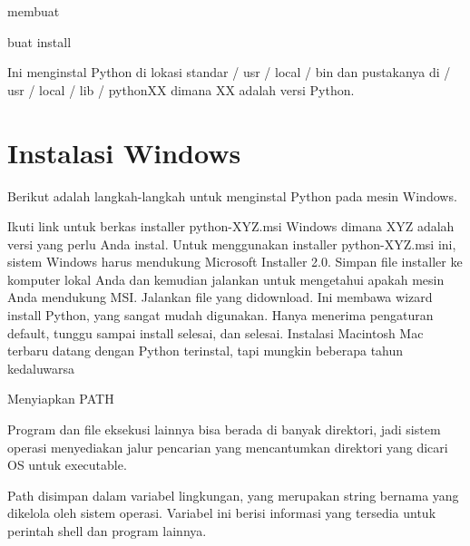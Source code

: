 {{\noindent
{\fontsize{14pt}{14pt}\selectfont membuat \\} \par
\vspace{14pt}
\noindent
{\fontsize{14pt}{14pt}\selectfont buat install \\} \par
\vspace{14pt}
\noindent
{\fontsize{14pt}{14pt}\selectfont Ini menginstal Python di lokasi standar / usr / local / bin dan pustakanya di / usr / local / lib / pythonXX dimana XX adalah versi Python. \\} \par
\vspace{14pt}
\noindent
{\fontsize{14pt}{14pt}\section {Instalasi Windows }
\noindent
{\fontsize{14pt}{14pt}\selectfont Berikut adalah langkah-langkah untuk menginstal Python pada mesin Windows. \\} \par
\noindent
{\fontsize{14pt}{14pt}\selectfont \vspace{\baselineskip}
Ikuti link untuk berkas installer python-XYZ.msi Windows dimana XYZ adalah versi yang perlu Anda instal. Untuk menggunakan installer python-XYZ.msi ini, sistem Windows harus mendukung Microsoft Installer 2.0. Simpan file installer ke komputer lokal Anda dan kemudian jalankan untuk mengetahui apakah mesin Anda mendukung MSI. Jalankan file yang didownload. Ini membawa wizard install Python, yang sangat mudah digunakan. Hanya menerima pengaturan default, tunggu sampai install selesai, dan selesai. Instalasi Macintosh Mac terbaru datang dengan Python terinstal, tapi mungkin beberapa tahun kedaluwarsa \\} \par
\noindent
{\fontsize{14pt}{14pt}\selectfont Menyiapkan PATH \\} \par
\noindent
{\fontsize{14pt}{14pt}\selectfont Program dan file eksekusi lainnya bisa berada di banyak direktori, jadi sistem operasi menyediakan jalur pencarian yang mencantumkan direktori yang dicari OS untuk executable. \\} \par
\vspace{14pt}
\noindent
{\fontsize{14pt}{14pt}\selectfont Path disimpan dalam variabel lingkungan, yang merupakan string bernama yang dikelola oleh sistem operasi. Variabel ini berisi informasi yang tersedia untuk perintah shell dan program lainnya. \\} \par
}}}
